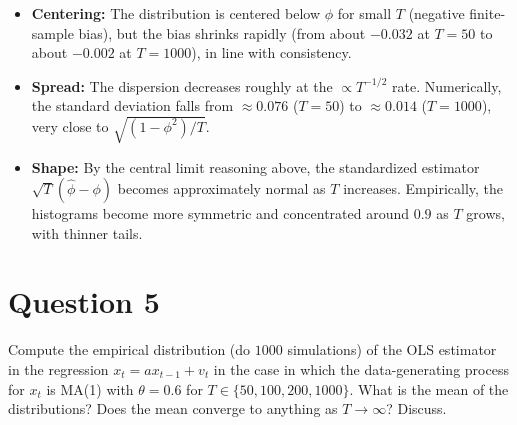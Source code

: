 \documentclass[dvipsnames,11pt]{article}
\begin{document}
\begin{solution}
        \begin{itemize}
            \item \textbf{Centering:} The distribution is centered below $\phi$ for small $T$ (negative finite-sample bias), but the bias shrinks rapidly (from about $-0.032$ at $T=50$ to about $-0.002$ at $T=1000$), in line with consistency.
          
            \item \textbf{Spread:} The dispersion decreases roughly at the $\propto T^{-1/2}$ rate. Numerically, the standard deviation falls from $\approx0.076$ ($T=50$) to $\approx0.014$ ($T=1000$), very close to $\sqrt{(1-\phi^2)/T}$.
          
            \item \textbf{Shape:} By the central limit reasoning above, the standardized estimator $\sqrt{T}(\widehat\phi-\phi)$ becomes approximately normal as $T$ increases. Empirically, the histograms become more symmetric and concentrated around $0.9$ as $T$ grows, with thinner tails.
        \end{itemize}
        
    \end{solution}

\section*{Question 5}
\setcounter{section}{5}

    Compute the empirical distribution (do $1000$ simulations) of the OLS estimator in the regression $x_t = a x_{t-1} + v_t$ in the case in which the data-generating process for $x_t$ is MA(1) with $\theta=0.6$ for $T\in\{50,100,200,1000\}$. What is the mean of the distributions? Does the mean converge to anything as $T\to\infty$? Discuss.
\end{document}
